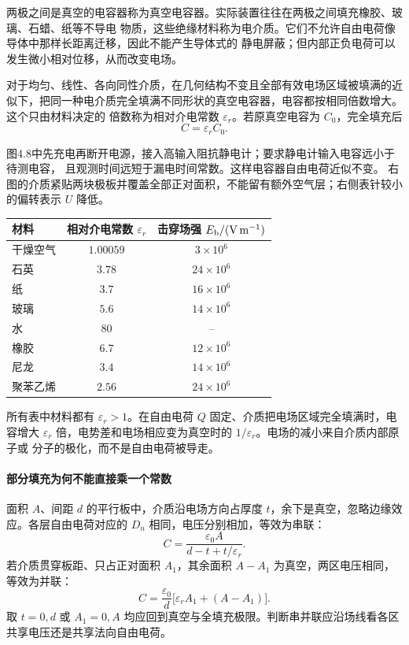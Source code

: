 两极之间是真空的电容器称为真空电容器。实际装置往往在两极之间填充橡胶、玻璃、石蜡、纸等不导电
物质，这些绝缘材料称为电介质。它们不允许自由电荷像导体中那样长距离迁移，因此不能产生导体式的
静电屏蔽；但内部正负电荷可以发生微小相对位移，从而改变电场。

对于均匀、线性、各向同性介质，在几何结构不变且全部有效电场区域被填满的近似下，把同一种电介质完全填满不同形状的真空电容器，电容都按相同倍数增大。这个只由材料决定的
倍数称为相对介电常数 $\varepsilon_r$。若原真空电容为 $C_0$，完全填充后
\begin{equation}
  \boxed{C=\varepsilon_rC_0}.
\end{equation}

图4.8中先充电再断开电源，接入高输入阻抗静电计；要求静电计输入电容远小于待测电容，
且观测时间远短于漏电时间常数。这样电容器自由电荷近似不变。
右图的介质紧贴两块极板并覆盖全部正对面积，不能留有额外空气层；右侧表针较小的偏转表示 $U$ 降低。
\dielectricMeterFigure
{}

\begin{table}[htbp]
\centering
\small
{}
\begin{tabular}{lcc}
\toprule
材料 & 相对介电常数 $\varepsilon_r$ & 击穿场强 $E_{\rm b}/(\mathrm{V\,m^{-1}})$\\
\midrule
干燥空气 & $1.00059$ & $3\times10^6$\\
石英 & $3.78$ & $24\times10^6$\\
纸 & $3.7$ & $16\times10^6$\\
玻璃 & $5.6$ & $14\times10^6$\\
水 & $80$ & --\\
橡胶 & $6.7$ & $12\times10^6$\\
尼龙 & $3.4$ & $14\times10^6$\\
聚苯乙烯 & $2.56$ & $24\times10^6$\\
\bottomrule
\end{tabular}
\end{table}

所有表中材料都有 $\varepsilon_r>1$。在自由电荷 $Q$ 固定、介质把电场区域完全填满时，电容增大
$\varepsilon_r$ 倍，电势差和电场相应变为真空时的 $1/\varepsilon_r$。电场的减小来自介质内部原子或
分子的极化，而不是自由电荷被导走。


\paragraph{部分填充为何不能直接乘一个常数}
面积 $A$、间距 $d$ 的平行板中，介质沿电场方向占厚度 $t$，余下是真空，忽略边缘效应。各层自由电荷对应的 $D_n$ 相同，电压分别相加，等效为串联：
\[
 C=\frac{\varepsilon_0A}{d-t+t/\varepsilon_r}.
\]
若介质贯穿板距、只占正对面积 $A_1$，其余面积 $A-A_1$ 为真空，两区电压相同，等效为并联：
\[
 C=\frac{\varepsilon_0}{d}\bigl[\varepsilon_rA_1+(A-A_1)\bigr].
\]
取 $t=0,d$ 或 $A_1=0,A$ 均应回到真空与全填充极限。判断串并联应沿场线看各区共享电压还是共享法向自由电荷。

